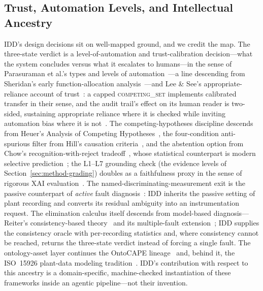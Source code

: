 \documentclass[preprint,12pt]{elsarticle}
\begin{document}
\subsection{Trust, Automation Levels, and Intellectual Ancestry}\label{sec:trust}
IDD's design decisions sit on well-mapped ground, and we credit the map. The three-state verdict is a level-of-automation and trust-calibration decision---what the system concludes versus what it escalates to humans---in the sense of Parasuraman et al.'s types and levels of automation~\cite{parasuraman2000model}---a line descending from Sheridan's early function-allocation analysis~\cite{sheridan1978human}---and Lee \& See's appropriate-reliance account of trust~\cite{lee2004trust}: a capped \mbox{\textsc{competing\_set}} implements calibrated transfer in their sense, and the audit trail's effect on its human reader is two-sided, sustaining appropriate reliance where it is checked while inviting automation bias where it is not~\cite{parasuraman2010complacency,bainbridge1983ironies}. The competing-hypotheses discipline descends from Heuer's Analysis of Competing Hypotheses~\cite{heuer1999psychology}, the four-condition anti-spurious filter from Hill's causation criteria~\cite{hill1965environment}, and the abstention option from Chow's recognition-with-reject tradeoff~\cite{chow1970optimum}, whose statistical counterpart is modern selective prediction~\cite{angelopoulos2023conformal}; the L1--L7 grounding check (the evidence levels of Section~\ref{sec:method-grading}) doubles as a faithfulness proxy in the sense of rigorous XAI evaluation~\cite{doshivelez2017rigorous}. The named-discriminating-measurement exit is the passive counterpart of \emph{active} fault diagnosis~\cite{scott2014input}: IDD inherits the passive setting of plant recording and converts its residual ambiguity into an instrumentation request. The elimination calculus itself descends from model-based diagnosis---Reiter's consistency-based theory~\cite{reiter1987theory} and its multiple-fault extension~\cite{dekleer1987diagnosing}; IDD supplies the consistency oracle with per-recording statistics and, where consistency cannot be reached, returns the three-state verdict instead of forcing a single fault. The ontology-asset layer continues the OntoCAPE lineage~\cite{morbach2009ontocape} and, behind it, the ISO~15926 plant-data modeling tradition~\cite{iso15926}. IDD's contribution with respect to this ancestry is a domain-specific, machine-checked instantiation of these frameworks inside an agentic pipeline---not their invention.
\end{document}
